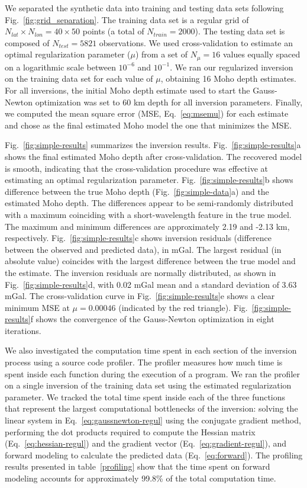 \documentclass[extra]{gji}
\begin{document}
We separated the synthetic data into training and testing data sets
following Fig.~\ref{fig:grid_separation}.
The training data set is a regular grid of
$N_{lat} \times N_{lon} = 40 \times 50$ points
(a total of $N_{train} = 2000$).
The testing data set is composed of $N_{test} = 5821$ observations.
We used cross-validation to estimate an optimal regularization parameter ($\mu$)
from a set of $N_\mu = 16$ values equally spaced on a logarithmic scale
between $10^{-6}$ and $10^{-1}$.
We ran our regularized inversion on the training data set
for each value of $\mu$,
obtaining 16 Moho depth estimates.
For all inversions, the initial Moho depth estimate
used to start the Gauss-Newton optimization
was set to 60 km depth for all inversion parameters.
Finally, we computed the mean square error (MSE, Eq.~\ref{eq:msemu})
for each estimate and chose as the final estimated Moho model
the one that minimizes the MSE.

Fig.~\ref{fig:simple-results} summarizes the inversion results.
Fig.~\ref{fig:simple-results}a shows the final estimated Moho depth
after cross-validation.
The recovered model is smooth, indicating that the cross-validation procedure
was effective at estimating an optimal regularization parameter.
Fig.~\ref{fig:simple-results}b shows difference between the true Moho depth
(Fig.~\ref{fig:simple-data}a) and the estimated Moho depth.
The differences appear to be semi-randomly distributed with a maximum
coinciding with a short-wavelength feature in the true model.
The maximum and minimum differences are approximately
2.19 and -2.13 km, respectively.
Fig.~\ref{fig:simple-results}c shows inversion residuals (difference between
the observed and predicted data), in mGal.
The largest residual (in absolute value) coincides with the largest difference
between the true model and the estimate.
The inversion residuals are normally distributed,
as shown in Fig.~\ref{fig:simple-results}d,
with 0.02 mGal mean and a standard deviation of 3.63 mGal.
The cross-validation curve in Fig.~\ref{fig:simple-results}e
shows a clear minimum MSE at $\mu = 0.00046$
(indicated by the red triangle).
Fig.~\ref{fig:simple-results}f shows the convergence of
the Gauss-Newton optimization in eight iterations.

We also investigated the computation time spent in each section of the inversion
process using a source code profiler.
The profiler measures how much time is spent inside each function during
the execution of a program.
We ran the profiler on a single inversion of the training data set
using the estimated regularization parameter.
We tracked the total time spent inside each of the three functions
that represent the largest computational bottlenecks of the inversion:
solving the linear system in Eq.~\ref{eq:gaussnewton-regul}
using the conjugate gradient method,
performing the dot products required to compute
the Hessian matrix (Eq.~\ref{eq:hessian-regul})
and the gradient vector (Eq.~\ref{eq:gradient-regul}),
and forward modeling to calculate the predicted data (Eq.~\ref{eq:forward}).
The profiling results presented in table~\ref{profiling}
show that the time spent on forward modeling accounts for approximately
99.8\% of the total computation time.
\end{document}

